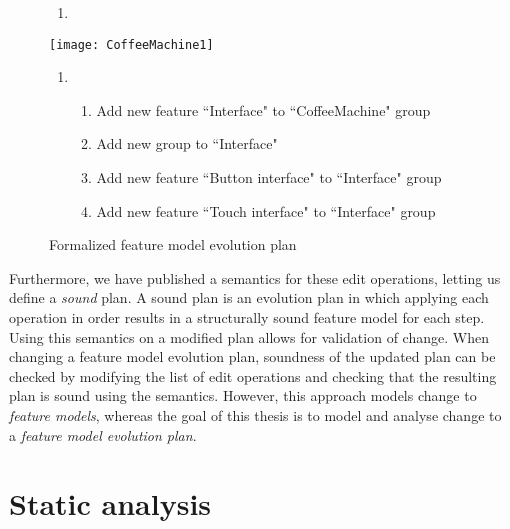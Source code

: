 \begin{figure}
   \footnotesize
   \begin{center}
      \begin{minipage}{0.98\textwidth}
         \begin{enumerate}[{\small $t_0$}]
            \item 
         \end{enumerate}
      \end{minipage}
      \texttt{[image: CoffeeMachine1]}
      \bigskip

      \begin{minipage}{0.98\textwidth}
         \begin{enumerate}[{\small $t_1$}]
            \item 
               \begin{enumerate}[ ]
                  \item Add new \mandatory{} feature ``Interface" to ``CoffeeMachine" \andtype{} group
                  \item Add new \xortype{} group to ``Interface"
                  \item Add new feature ``Button interface" to ``Interface" \xortype{} group
                  \item Add new feature ``Touch interface"  to ``Interface" \xortype{} group               \end{enumerate}
         \end{enumerate}
      \end{minipage}
      \caption{Formalized feature model evolution plan}
      \label{ex:formal-evolution-plan}
   \end{center}
\end{figure}

Furthermore, we have published a semantics for these edit operations, letting us define a \emph{sound} plan. A sound plan is an evolution plan in which applying each operation in order results in a structurally sound feature model for each step. Using this semantics on a modified plan allows for validation of change. When changing a feature model evolution plan, soundness of the updated plan can be checked by modifying the list of edit operations and checking that the resulting plan is sound using the semantics. However, this approach models change to \emph{feature models}, whereas the goal of this thesis is to model and analyse change to a \emph{feature model evolution plan}.

\section{Static analysis}
\label{sec:static-analysis}

